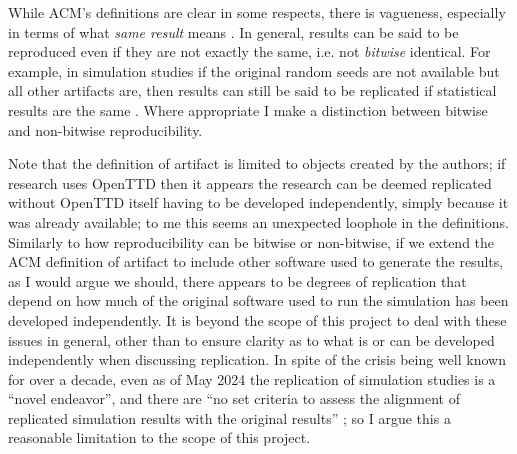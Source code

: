 \documentclass[logo,msc,dsti]{style/infthesis}    %
\begin{document}
While ACM's definitions are clear in some respects, there is vagueness, especially in terms of what \emph{same result} means \cite{hill2022reproducibility}. In general, results can be said to be reproduced even if they are not exactly the same, i.e. not \emph{bitwise} identical. For example, in simulation studies if the original random seeds are not available but all other artifacts are, then results can still be said to be replicated if statistical results are the same \cite{luijken2024replicability}. Where appropriate I make a distinction between bitwise and non-bitwise reproducibility.

Note that the definition of artifact is limited to objects created by the authors; if research uses OpenTTD then it appears the research can be deemed replicated without OpenTTD itself having to be developed independently, simply because it was already available; to me this seems an unexpected loophole in the definitions. Similarly to how reproducibility can be bitwise or non-bitwise, if we extend the ACM definition of artifact to include other software used to generate the results, as I would argue we should, there appears to be degrees of replication that depend on how much of the original software used to run the simulation has been developed independently. It is beyond the scope of this project to deal with these issues in general, other than to ensure clarity as to what is or can be developed independently when discussing replication. In spite of the crisis being well known for over a decade, even as of May 2024 the replication of simulation studies is a ``novel endeavor'', 
and there are ``no set criteria to assess the alignment of replicated simulation results with the original results'' \cite{luijken2024replicability}; so I argue this a reasonable limitation to the scope of this project.


\end{document}
